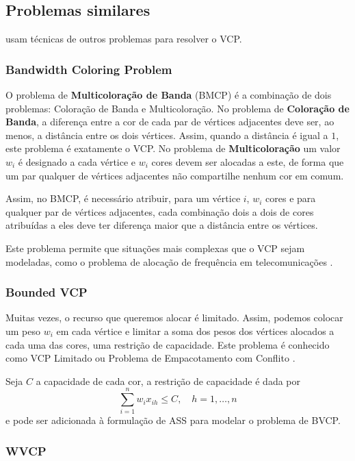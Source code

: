 \documentclass[11pt]{article}
\begin{document}
\subsection{Problemas similares}
\label{sec:org07a55b5}
\textcites{Cornaz2008oneonecorrespondence}[][]{Cornaz2017SolvingVertexColoring} usam técnicas de outros problemas para resolver o VCP.
\subsubsection{Bandwidth Coloring Problem}
\label{sec:org808ad98}
O problema de \textbf{Multicoloração de Banda} (BMCP) é a combinação de dois problemas: Coloração de Banda e Multicoloração.
No problema de \textbf{Coloração de Banda}, a diferença entre a cor de cada par de vértices adjacentes deve ser, ao menos, a distância entre os dois vértices. Assim, quando a distância é igual a \(1\), este problema é exatamente o VCP.
No problema de \textbf{Multicoloração} um valor \(w_i\) é designado a cada vértice e \(w_i\) cores devem ser alocadas a este, de forma que um par qualquer de vértices adjacentes não compartilhe nenhum cor em comum.

Assim, no BMCP, é necessário atribuir, para um vértice \(i\), \(w_i\) cores e para qualquer par de vértices adjacentes, cada combinação dois a dois de cores atribuídas a eles deve ter diferença maior que a distância entre os vértices.

Este problema permite que situações mais complexas que o VCP sejam modeladas, como o problema de alocação de frequência em telecomunicações \autocite{Aardal2007Modelssolutiontechniques}.

\subsubsection{Bounded VCP}
\label{sec:orgfa8dd4f}
Muitas vezes, o recurso que queremos alocar é limitado. Assim, podemos colocar um peso \(w_i\) em cada vértice e limitar a soma dos pesos dos vértices alocados a cada uma das cores, uma restrição de capacidade.
Este problema é conhecido como VCP Limitado ou Problema de Empacotamento com Conflito \textcite{Connolly1991KnapsackProblemsAlgorithms}.

Seja \(C\) a capacidade de cada cor, a restrição de capacidade é dada por
\[ \sum_{i=1}^n w_i x_{ih} \leq C, \quad h = 1, \dots, n\]
e pode ser adicionada à formulação de ASS para modelar o problema de BVCP.
\subsubsection{WVCP}
\label{sec:org8f589e6}
\end{document}
